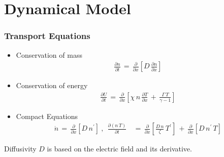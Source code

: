 \documentclass[10pt]{beamer}
\begin{document}
\section{Dynamical Model}
\begin{frame} %
\frametitle{Transport Equations}
\begin{itemize}
	\item Conservation of mass
\begin{align} %
	\frac{\partial n}{\partial t} \,=\, \frac{\partial}{\partial x}
		\left[D \, \frac{\partial n}{\partial x}\right]
\end{align}
	\item Conservation of energy
\begin{align} %
	\frac{\partial U}{\partial t} \,=\, \frac{\partial}{\partial x}
		\left[\chi \, n \, \frac{\partial T}{\partial x} \,+\,
		\frac{\Gamma \, T}{\gamma - 1}\right]
\end{align}
	\item Compact Equations
\begin{align} %
	\dot{n} \,=\, \frac{\partial}{\partial x} \left[D \, n^\prime\right]~,~~
	\frac{\partial(n\,T)}{\partial t} \,&=\, \frac{\partial}{\partial x}
		\left[\frac{D\,n}{\zeta} \, T^\prime\right]
		\,+\, \frac{\partial}{\partial x} \left[D\, n^\prime \, T \right]
		\label{eq:U_compact}
\end{align}
\end{itemize}
Diffusivity $D$ is based on the electric field and its derivative.
\end{frame}

\end{document}
